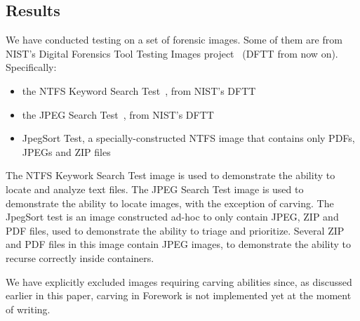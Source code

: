 \documentclass[twoside]{article}
\begin{document}
\begin{multicols}{2}


\section{Results}
\label{results}

We have conducted testing on a set of forensic images. Some of them are from
NIST's Digital Forensics Tool Testing Images project~\cite{dftt} (DFTT from now
on). Specifically:

\begin{itemize}
    \item the NTFS Keyword Search Test~\cite{dftt03}, from NIST's DFTT
    \item the JPEG Search Test~\cite{dftt08}, from NIST's DFTT
    \item JpegSort Test, a specially-constructed NTFS image that contains
        only PDFs, JPEGs and ZIP files
\end{itemize}

The NTFS Keywork Search Test image is used to demonstrate the ability to locate
and analyze text files. The JPEG Search Test image is used to demonstrate the
ability to locate images, with the exception of carving. The JpegSort test is an
image constructed ad-hoc to only contain JPEG, ZIP and PDF files, used to
demonstrate the ability to triage and prioritize. Several ZIP and PDF files in
this image contain JPEG images, to demonstrate the ability to recurse correctly
inside containers.

We have explicitly excluded images requiring carving abilities since, as
discussed earlier in this paper, carving in Forework is not implemented yet at
the moment of writing.


\end{multicols}
\end{document}
